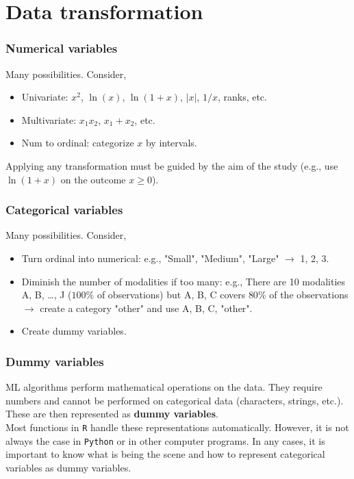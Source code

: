 \section{Data transformation}
\begin{frame}
\frametitle{Numerical variables}
Many possibilities. Consider,
\begin{itemize}
\item Univariate: $x^2$, $\ln(x)$, $\ln(1+x)$, $|x|$, $1/x$, ranks, etc.
\item Multivariate: $x_1 x_2$, $x_1 + x_2$, etc.
\item Num to ordinal: categorize $x$ by intervals.
\end{itemize}
Applying any transformation must be guided by the aim of the study (e.g., use $\ln(1+x)$ on the outcome $x\geq 0$). 
\end{frame}
\begin{frame}
\frametitle{Categorical variables}
Many possibilities. Consider,
\begin{itemize}
\item Turn ordinal into numerical: e.g., "Small", "Medium", "Large" $\rightarrow$ 1, 2, 3.
\item Diminish the number of modalities if too many: e.g., There are 10 modalities A, B, \ldots, J ($100\%$ of observations) but A, B, C covers $80\%$ of the observations $\rightarrow$ create a category "other" and use A, B, C, "other".
\item Create dummy variables.
\end{itemize}
\end{frame}
\begin{frame}
\frametitle{Dummy variables}
ML algorithms perform mathematical operations on the data. They require numbers and cannot be performed on categorical data (characters, strings, etc.). These are then represented as {\bf dummy variables}. \\
\vspace{0.3cm}
Most functions in {\tt R} handle these representations automatically. However, it is not always the case in {\tt Python} or in other computer programs. In any cases, it is important to know what is being the scene and how to represent categorical variables as dummy variables.
\end{frame}
